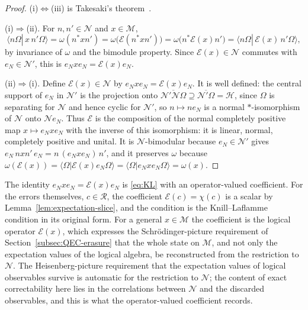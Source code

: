\documentclass[a4paper,11pt]{article}
\theoremstyle{definition}
\newcommand{\mE}{\mathcal{E}}
\begin{document}
\begin{proof}
(i)$\Leftrightarrow$(iii) is Takesaki's theorem~\cite{Takesaki1972}.

(i)$\Rightarrow$(ii). For $n,n'\in\mathcal N$ and $x\in\mathcal M$,
\[
 \langle n\Omega|\,x\,n'\Omega\rangle=\omega(n^*xn')=\omega\bigl(\mE(n^*xn')\bigr)=\omega\bigl(n^*\mE(x)n'\bigr)=\langle n\Omega|\,\mE(x)\,n'\Omega\rangle,
\]
by invariance of $\omega$ and the bimodule property. Since $\mE(x)\in\mathcal N$ commutes with $e_N\in\mathcal N'$, this is $e_Nxe_N=\mE(x)e_N$.

(ii)$\Rightarrow$(i). Define $\mE(x)\in\mathcal N$ by $e_Nxe_N=\mE(x)e_N$. It is well defined: the central support of $e_N$ in $\mathcal N'$ is the projection onto $\overline{\mathcal N'\mathcal N\Omega}\supseteq\overline{\mathcal N'\Omega}=\mathcal H$, since $\Omega$ is separating for $\mathcal N$ and hence cyclic for $\mathcal N'$, so $n\mapsto ne_N$ is a normal $*$-isomorphism of $\mathcal N$ onto $\mathcal Ne_N$. Thus $\mE$ is the composition of the normal completely positive map $x\mapsto e_Nxe_N$ with the inverse of this isomorphism: it is linear, normal, completely positive and unital. It is $\mathcal N$-bimodular because $e_N\in\mathcal N'$ gives $e_N\,nxn'\,e_N=n\,(e_Nxe_N)\,n'$, and it preserves $\omega$ because $\omega(\mE(x))=\langle\Omega|\mE(x)e_N\Omega\rangle=\langle\Omega|e_Nxe_N\Omega\rangle=\omega(x)$.
\end{proof}

The identity $e_Nxe_N=\mE(x)e_N$ is \eqref{eq:KL} with an operator-valued coefficient. For the errors themselves, $c\in\mathcal R$, the coefficient $\mE(c)=\chi(c)$ is a scalar by Lemma~\ref{lem:expectation-slice}, and the condition is the Knill--Laflamme condition in its original form. For a general $x\in\mathcal M$ the coefficient is the logical operator $\mE(x)$, which expresses the Schr\"odinger-picture requirement of Section~\ref{subsec:QEC-erasure} that the whole state on $\mathcal M$, and not only the expectation values of the logical algebra, be reconstructed from the restriction to $\mathcal N$. The Heisenberg-picture requirement that the expectation values of logical observables survive is automatic for the restriction to $\mathcal N$; the content of exact correctability here lies in the correlations between $\mathcal N$ and the discarded observables, and this is what the operator-valued coefficient records.
\end{document}
